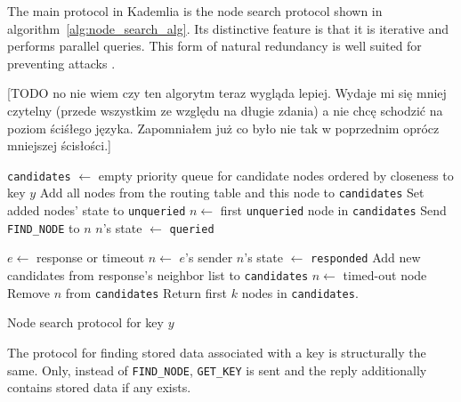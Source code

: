   The main protocol in Kademlia is the node search protocol shown in
  algorithm~\ref{alg:node_search_alg}. Its distinctive feature is that it is
  iterative and performs parallel queries. This form of natural redundancy is
  well suited for preventing attacks \cite{sit02}.

  [TODO no nie wiem czy ten algorytm teraz wygląda lepiej. Wydaje mi się mniej
    czytelny (przede wszystkim ze względu na długie zdania) a nie chcę schodzić
    na poziom ściśłego języka. Zapomniałem już co było nie tak w poprzednim
  opr{\'o}cz mniejszej ścisłości.]

  \begin{algorithm}
    \begin{algorithmic}[1]
    \STATE \texttt{candidates} $\leftarrow$ empty priority queue for candidate
    nodes ordered by closeness to key $y$
    \STATE Add all nodes from the routing table and this node to
    \texttt{candidates}
    \STATE Set added nodes' state to \texttt{unqueried}
        \STATE $n \leftarrow$ first \texttt{unqueried} node in
          \texttt{candidates} 
        \STATE Send \texttt{FIND\_NODE} to $n$
        \STATE $n$'s state $\leftarrow$ \texttt{queried}
    \ENDWHILE
      
    \STATE $e \leftarrow$ response or timeout
      \STATE $n \leftarrow$ $e$'s sender
      \STATE $n$'s state $\leftarrow$ \texttt{responded}
      \STATE Add new candidates from response's neighbor list to
      \texttt{candidates}
    \ELSE
      \STATE $n \leftarrow$ timed-out node
      \STATE Remove $n$ from \texttt{candidates}
    \ENDIF
    \ENDWHILE
    \STATE Return first $k$ nodes in \texttt{candidates}.
  \end{algorithmic}
    \caption{Node search protocol for key $y$}
    \label{alg:node_search_alg}
  \end{algorithm}

  The protocol for finding stored data associated with a key is structurally the
  same. Only, instead of \texttt{FIND\_NODE}, \texttt{GET\_KEY} is sent and the
  reply additionally contains stored data if any exists.

